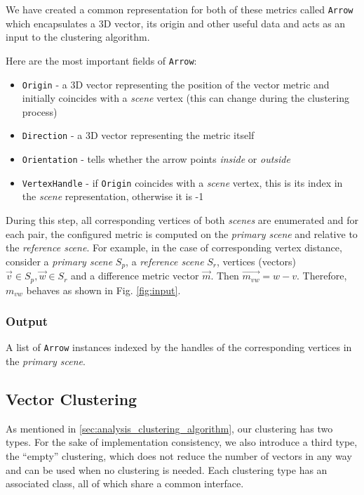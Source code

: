 We have created a common representation for both of these metrics called \verb+Arrow+ which encapsulates a 3D vector, its origin and other useful data and acts as an input to the clustering algorithm.

Here are the most important fields of \verb+Arrow+:

\begin{itemize}
\item \verb+Origin+ - a 3D vector representing the position of the vector metric and initially coincides with a {\it scene} vertex (this can change during the clustering process)
\item \verb+Direction+ - a 3D vector representing the metric itself
\item \verb+Orientation+ - tells whether the arrow points {\it inside} or {\it outside}
\item \verb+VertexHandle+ - if \verb+Origin+ coincides with a {\it scene} vertex, this is its index in the {\it scene} representation, otherwise it is -1
\end{itemize}

During this step, all corresponding vertices of both {\it scenes} are enumerated and for each pair, the configured metric is computed on the {\it primary scene} and relative to the {\it reference scene}. For example, in the case of corresponding vertex distance, consider a {\it primary scene} \(S_p\), a {\it reference scene} \(S_r\), vertices (vectors) \(\overrightarrow{v} \in S_p, \overrightarrow{w} \in S_r\) and a difference metric vector \(\overrightarrow{m}\). Then \(\overrightarrow{m_{vw}} = w - v\). Therefore, \(m_{vw}\) behaves as shown in Fig. \ref{fig:input}.

\subsubsection{Output}

A list of \verb+Arrow+ instances indexed by the handles of the corresponding vertices in the {\it primary scene}.

\subsection{Vector Clustering}
\label{sec:implementation_clustering}

As mentioned in \ref{sec:analysis_clustering_algorithm}, our clustering has two types. For the sake of implementation consistency, we also introduce a third type, the ``empty'' clustering, which does not reduce the number of vectors in any way and can be used when no clustering is needed. Each clustering type has an associated class, all of which share a common interface.


